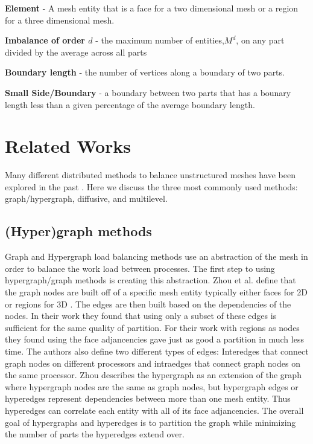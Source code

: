 \documentclass{thesis}
\begin{document}
{\bf Element} - A mesh entity that is a face for a two dimensional mesh or a region for a three dimensional mesh.

{\bf Imbalance of order $d$} - the maximum number of entities,$M^d$, on any part divided by the average across all parts

{\bf Boundary length} - the number of vertices along a boundary of two parts.

{\bf Small Side/Boundary} - a boundary between two parts that has a bounary length less than a given percentage of the average boundary length.


\chapter{Related Works}
Many different distributed methods to balance unstructured meshes have been 
explored in the past \cite{multidiffuse,surveygraph}. Here we discuss the 
three most commonly used methods: graph/hypergraph, diffusive, and multilevel.

\section{(Hyper)graph methods}
Graph and Hypergraph load balancing methods use an abstraction of the mesh in 
order to balance the work load between processes. The first step to using 
hypergraph/graph methods is creating this abstraction. Zhou et al. define that 
the graph nodes are built off of a specific mesh entity typically either faces 
for 2D or regions for 3D \cite{zhougraph}. The edges are then built based on the
dependencies of the nodes. In their work they found that using only a subset of 
these edges is sufficient for the same quality of partition. For their work with
regions as nodes they found using the face adjancencies gave just as good a 
partition in much less time. The authors also define two different types of 
edges: Interedges that connect graph nodes on different processors and 
intraedges that connect graph nodes on the same processor. Zhou describes the 
hypergraph as an extension of the graph where hypergraph nodes are the same as 
graph nodes, but hypergraph edges or hyperedges represent dependencies between 
more than one mesh entity. Thus hyperedges can correlate each entity with all 
of its face adjancencies. The overall goal of hypergraphs and hyperedges is to 
partition the graph while minimizing the number of parts the hyperedges extend 
over.
\end{document}

